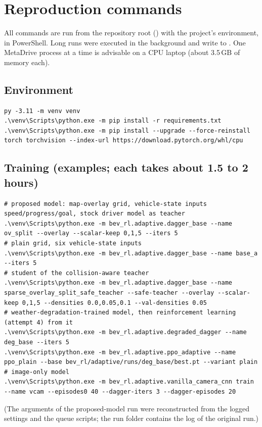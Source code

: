\section{Reproduction commands}\label{app:commands}

All commands are run from the repository root () with the project's environment, in PowerShell. Long runs were executed in the background and write to . One MetaDrive process at a time is advisable on a CPU laptop (about 3.5\,GB of memory each).

\subsection{Environment}
\begin{lstlisting}
py -3.11 -m venv venv
.\venv\Scripts\python.exe -m pip install -r requirements.txt
.\venv\Scripts\python.exe -m pip install --upgrade --force-reinstall torch torchvision --index-url https://download.pytorch.org/whl/cpu
\end{lstlisting}

\subsection{Training (examples; each takes about 1.5 to 2 hours)}
\begin{lstlisting}
# proposed model: map-overlay grid, vehicle-state inputs speed/progress/goal, stock driver model as teacher
.\venv\Scripts\python.exe -m bev_rl.adaptive.dagger_base --name ov_split --overlay --scalar-keep 0,1,5 --iters 5
# plain grid, six vehicle-state inputs
.\venv\Scripts\python.exe -m bev_rl.adaptive.dagger_base --name base_a --iters 5
# student of the collision-aware teacher
.\venv\Scripts\python.exe -m bev_rl.adaptive.dagger_base --name sparse_overlay_split_safe_teacher --safe-teacher --overlay --scalar-keep 0,1,5 --densities 0.0,0.05,0.1 --val-densities 0.05
# weather-degradation-trained model, then reinforcement learning (attempt 4) from it
.\venv\Scripts\python.exe -m bev_rl.adaptive.degraded_dagger --name deg_base --iters 5
.\venv\Scripts\python.exe -m bev_rl.adaptive.ppo_adaptive --name ppo_plain --base bev_rl/adaptive/runs/deg_base/best.pt --variant plain
# image-only model
.\venv\Scripts\python.exe -m bev_rl.adaptive.vanilla_camera_cnn train --name vcam --episodes0 40 --dagger-iters 3 --dagger-episodes 20
\end{lstlisting}
(The arguments of the proposed-model run were reconstructed from the logged settings and the queue scripts; the run folder  contains the log of the original run.)

